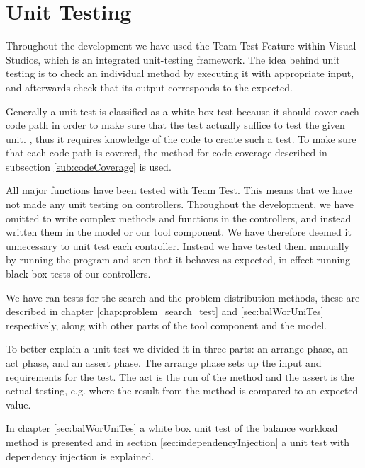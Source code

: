 \section{Unit Testing}
\label{chap:testing}
Throughout the development we have used the Team Test Feature within Visual Studios, which is an integrated unit-testing framework. \cite{teamtest}
The idea behind unit testing is to check an individual method by executing it with appropriate input, and afterwards check that its output corresponds to the expected.

Generally a unit test is classified as a white box test because it should cover each code path in order to make sure that the test actually suffice to test the given unit. \cite[p.~39]{williams06}, thus it requires knowledge of the code to create such a test.
To make sure that each code path is covered, the method for code coverage described in subsection \ref{sub:codeCoverage} is used.

All major functions have been tested with Team Test. This means that we have not made any unit testing on controllers. 
Throughout the development, we have omitted to write complex methods and functions in the controllers, and instead written them in the model or our tool component. We have therefore deemed it unnecessary to unit test each controller. Instead we have tested them manually by running the program and seen that it behaves as expected, in effect running black box tests of our controllers.

We have ran tests for the search and the problem distribution methods, these are described in chapter \ref{chap:problem_search_test} and \ref{sec:balWorUniTes} respectively, along with other parts of the tool component and the model.

To better explain a unit test we divided it in three parts: an arrange phase, an act phase, and an assert phase. 
The arrange phase sets up the input and requirements for the test. 
The act is the run of the method and the assert is the actual testing, e.g. where the result from the method is compared to an expected value. 

In chapter \ref{sec:balWorUniTes} a white box unit test of the balance workload method is presented and in section \ref{sec:independencyInjection} a unit test with dependency injection is explained.